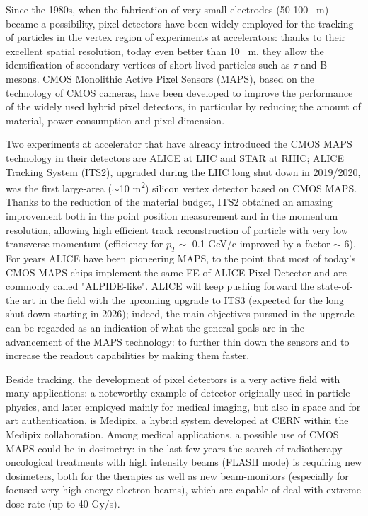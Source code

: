 \documentclass[a4paper]{report}
\begin{document}
\linenumbers

Since the 1980s, when the fabrication of very small electrodes (50-100 \si{\mu m}) became a possibility, pixel detectors have been widely employed for the tracking of particles in the vertex region of experiments at accelerators: thanks to their excellent spatial resolution, today even better than 10 \si{\mu m}, they allow the identification of secondary vertices of short-lived particles such as $\tau$ and B mesons. 
CMOS Monolithic Active Pixel Sensors (MAPS), based on the technology of CMOS cameras, have been developed to improve the performance of the widely used hybrid pixel detectors, in particular by reducing the amount of material, power consumption and pixel dimension.  

Two experiments at accelerator that have already introduced the CMOS MAPS technology in their detectors are ALICE at LHC and STAR at RHIC; ALICE Tracking System (ITS2), upgraded during the LHC long shut down in 2019/2020, was the first large-area ($\sim$10 \si{m^2}) silicon vertex detector based on CMOS MAPS. Thanks to the reduction of the material budget, ITS2 obtained an amazing improvement both in the point position measurement and in the momentum resolution, allowing high efficient track reconstruction of particle with very low transverse momentum (efficiency for $p_{T}\sim$ 0.1 \si{GeV/c} improved by a factor $\sim$ 6).
For years ALICE have been pioneering MAPS, to the point that most of today's CMOS MAPS chips implement the same FE of ALICE Pixel Detector and are commonly called "ALPIDE-like". ALICE will keep pushing forward the state-of-the art in the field with the upcoming upgrade to ITS3 (expected for the long shut down starting in 2026); indeed, the main objectives pursued in the upgrade can be regarded as an indication of what the general goals are in the advancement of the MAPS technology: to further thin down the sensors and to increase the readout capabilities by making them faster.   

Beside tracking, the development of pixel detectors is a very active field with many applications: a noteworthy example of detector originally used in particle physics, and later employed mainly for medical imaging, but also in space and for art authentication, is Medipix, a hybrid system developed at CERN within the Medipix collaboration.
Among medical applications, a possible use of CMOS MAPS could be in dosimetry: in the last few years the search of radiotherapy oncological treatments with high intensity beams (FLASH mode) is requiring new dosimeters, both for the therapies as well as new beam-monitors (especially for focused very high energy electron beams), which are capable of deal with extreme dose rate (up to 40 \si{Gy/s}).
\end{document}
